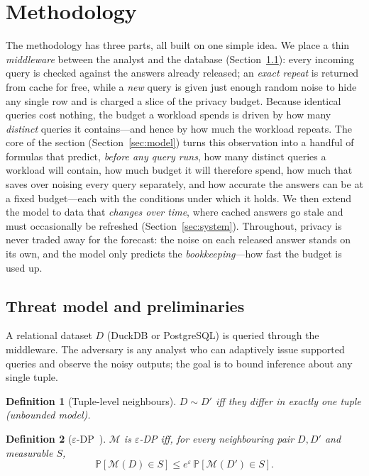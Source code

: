 \documentclass[sigconf,nonacm]{acmart}
\newcommand{\eps}{\varepsilon}
\newcommand{\Prob}{\mathbb{P}}
\newtheorem{defn}{Definition}
\begin{document}
\section{Methodology}
\label{sec:method}

\noindent The methodology has three parts, all built on one simple idea. We place a thin \emph{middleware} between the analyst and the database (Section~\ref{sec:prelim}): every incoming query is checked against the answers already released; an \emph{exact repeat} is returned from cache for free, while a \emph{new} query is given just enough random noise to hide any single row and is charged a slice of the privacy budget. Because identical queries cost nothing, the budget a workload spends is driven by how many \emph{distinct} queries it contains---and hence by how much the workload repeats. The core of the section (Section~\ref{sec:model}) turns this observation into a handful of formulas that predict, \emph{before any query runs}, how many distinct queries a workload will contain, how much budget it will therefore spend, how much that saves over noising every query separately, and how accurate the answers can be at a fixed budget---each with the conditions under which it holds. We then extend the model to data that \emph{changes over time}, where cached answers go stale and must occasionally be refreshed (Section~\ref{sec:system}). Throughout, privacy is never traded away for the forecast: the noise on each released answer stands on its own, and the model only predicts the \emph{bookkeeping}---how fast the budget is used up.

\subsection{Threat model and preliminaries}
\label{sec:prelim}

A relational dataset $D$ (DuckDB or PostgreSQL) is queried through the middleware. The adversary is any analyst who can adaptively issue supported queries and observe the noisy outputs; the goal is to bound inference about any single tuple.

\begin{defn}[Tuple-level neighbours]
$D\sim D'$ iff they differ in exactly one tuple (unbounded model).
\end{defn}
\begin{defn}[$\eps$-DP~\cite{dwork2006calibrating}]
$\mathcal{M}$ is $\eps$-DP iff, for every neighbouring pair $D,D'$ and measurable $S$,
\[\Prob[\mathcal{M}(D)\in S]\le e^\eps\,\Prob[\mathcal{M}(D')\in S].\]
\end{defn}
\end{document}
